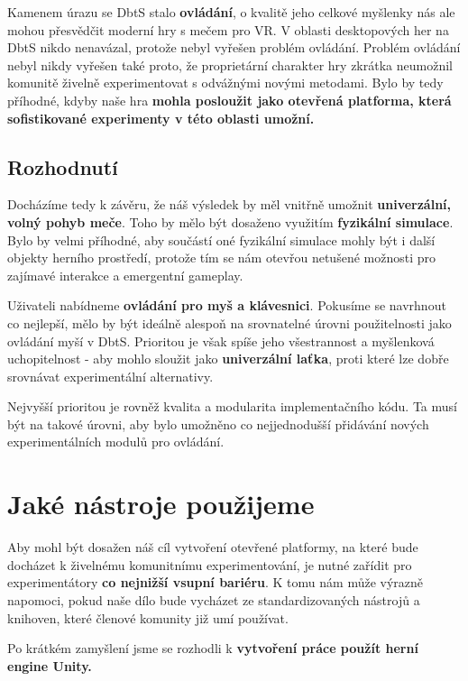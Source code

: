 Kamenem úrazu se \acl{DbtS} stalo \textbf{ovládání}, o kvalitě jeho celkové myšlenky nás ale mohou přesvědčit moderní hry s mečem pro VR. V oblasti desktopových her na \acl{DbtS} nikdo nenavázal, protože nebyl vyřešen problém ovládání. Problém ovládání nebyl nikdy vyřešen také proto, že proprietární charakter hry zkrátka neumožnil komunitě živelně experimentovat s odvážnými novými metodami. Bylo by tedy příhodné, kdyby naše hra \textbf{mohla posloužit jako otevřená platforma, která sofistikované experimenty v této oblasti umožní.} 

\subsection{Rozhodnutí}

Docházíme tedy k závěru, že náš výsledek by měl vnitřně umožnit \textbf{univerzální, volný pohyb meče}. Toho by mělo být dosaženo využitím \textbf{fyzikální simulace}. Bylo by velmi příhodné, aby součástí oné fyzikální simulace mohly být i další objekty herního prostředí, protože tím se nám otevřou netušené možnosti pro zajímavé interakce a emergentní gameplay.

Uživateli nabídneme \textbf{ovládání pro myš a klávesnici}. Pokusíme se navrhnout co nejlepší, mělo by být ideálně alespoň na srovnatelné úrovni použitelnosti jako ovládání myší v \acs{DbtS}. Prioritou je však spíše jeho všestrannost a myšlenková uchopitelnost - aby mohlo sloužit jako \textbf{univerzální laťka}, proti které lze dobře srovnávat experimentální alternativy. 

Nejvyšší prioritou je rovněž kvalita a modularita implementačního kódu. Ta musí být na takové úrovni, aby bylo umožněno co nejjednodušší přidávání nových experimentálních modulů pro ovládání.

\section{Jaké nástroje použijeme}

Aby mohl být dosažen náš cíl vytvoření otevřené platformy, na které bude docházet k živelnému komunitnímu experimentování, je nutné zařídit pro experimentátory \textbf{co nejnižší vsupní bariéru}. K tomu nám může výrazně napomoci, pokud naše dílo bude vycházet ze standardizovaných nástrojů a knihoven, které členové komunity již umí používat.

Po krátkém zamyšlení jsme se rozhodli k \textbf{vytvoření práce použít herní engine Unity.} 

